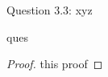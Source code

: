 \begin{solution}{Question 3.3: xyz}\label{ques:33}
    \begin{question}
    ques
    \end{question}
    \tcblower{}
    \begin{proof}
    this proof
    \end{proof}
\end{solution}

